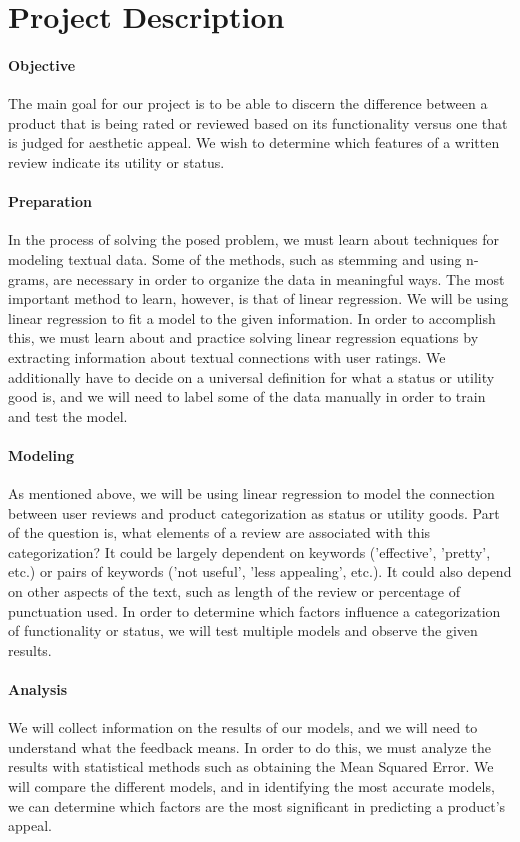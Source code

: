 \documentclass[dvips,12pt]{article}
\begin{document}
\section{Project Description}

\paragraph{Objective}
The main goal for our project is to be able to discern the difference between a product that is being rated or reviewed based on its functionality versus one that is judged for aesthetic appeal. We wish to determine which features of a written review indicate its utility or status.

\paragraph{Preparation}
In the process of solving the posed problem, we must learn about techniques for modeling textual data. Some of the methods, such as stemming and using n-grams, are necessary in order to organize the data in meaningful ways. The most important method to learn, however, is that of linear regression. We will be using linear regression to fit a model to the given information. In order to accomplish this, we must learn about and practice solving linear regression equations by extracting information about textual connections with user ratings. We additionally have to decide on a universal definition for what a status or utility good is, and we will need to label some of the data manually in order to train and test the model. 

\paragraph{Modeling}
As mentioned above, we will be using linear regression to model the connection between user reviews and product categorization as status or utility goods. Part of the question is, what elements of a review are associated with this categorization? It could be largely dependent on keywords ('effective', 'pretty', etc.) or pairs of keywords ('not useful', 'less appealing', etc.). It could also depend on other aspects of the text, such as length of the review or percentage of punctuation used. In order to determine which factors influence a categorization of functionality or status, we will test multiple models and observe the given results.

\paragraph{Analysis}
We will collect information on the results of our models, and we will need to understand what the feedback means. In order to do this, we must analyze the results with statistical methods such as obtaining the Mean Squared Error. We will compare the different models, and in identifying the most accurate models, we can determine which factors are the most significant in predicting a product's appeal.
\end{document}

